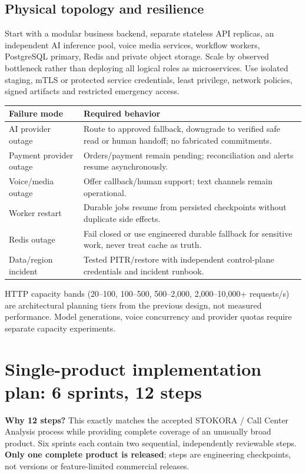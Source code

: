 \documentclass[10.5pt,a4paper,oneside]{article}
\begin{document}
\subsection{Physical topology and resilience}
Start with a modular business backend, separate stateless API replicas, an independent AI inference pool, voice media services, workflow workers, PostgreSQL primary, Redis and private object storage. Scale by observed bottleneck rather than deploying all logical roles as microservices. Use isolated staging, mTLS or protected service credentials, least privilege, network policies, signed artifacts and restricted emergency access.
\begin{tabularx}{\textwidth}{@{}L{36mm}Y@{}}
\toprule{}\textbf{Failure mode} & \textbf{Required behavior}\\\midrule
AI provider outage & Route to approved fallback, downgrade to verified safe read or human handoff; no fabricated commitments.\\
Payment provider outage & Orders/payment remain pending; reconciliation and alerts resume asynchronously.\\
Voice/media outage & Offer callback/human support; text channels remain operational.\\
Worker restart & Durable jobs resume from persisted checkpoints without duplicate side effects.\\
Redis outage & Fail closed or use engineered durable fallback for sensitive work, never treat cache as truth.\\
Data/region incident & Tested PITR/restore with independent control-plane credentials and incident runbook.\\
\bottomrule\end{tabularx}
HTTP capacity bands (20--100, 100--500, 500--2,000, 2,000--10,000+ requests/s) are architectural planning tiers from the previous design, not measured performance. Model generations, voice concurrency and provider quotas require separate capacity experiments.

\clearpage
\section{Single-product implementation plan: 6 sprints, 12 steps}
\begin{keybox}
\textbf{Why 12 steps?} This exactly matches the accepted STOKORA / Call Center Analysis process while providing complete coverage of an unusually broad product. Six sprints each contain two sequential, independently reviewable steps. \textbf{Only one complete product is released}; steps are engineering checkpoints, not versions or feature-limited commercial releases.
\end{keybox}
\end{document}
